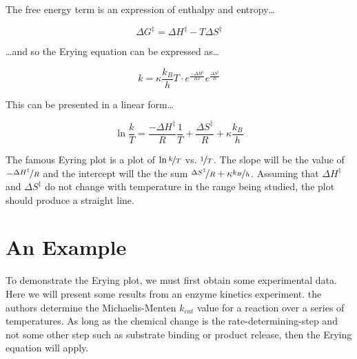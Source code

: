 \documentclass{tufte-handout}
\begin{document}
The free energy term is an expression of enthalpy and entropy\ldots

$$ \Delta G^\ddagger = \Delta H^\ddagger - T\Delta S^\ddagger $$

\noindent \ldots and so the Erying equation can be expressed as\ldots

$$ k = \kappa \frac{k_B}{h}T \cdot e^{\frac{-\Delta H^\ddagger}{RT}}e^{\frac{\Delta S^\ddagger}{R}}$$

This can be presented in a linear form\ldots

$$ \ln{\frac{k}{T}} = \frac{-\Delta H^\ddagger}{R} \frac{1}{T} + \frac{\Delta S^\ddagger}{R} + \kappa \frac{k_B}{h} $$ 
\vspace{0mm}

The famous Eyring plot is a plot of $\ln{\nicefrac{k}{T}}$ vs. $\nicefrac{1}{T}$. The slope will be the value of $-\nicefrac{\Delta H^\ddagger}{R}$ and the intercept will the the sum $\nicefrac{\Delta S^\ddagger}{R} + \kappa \nicefrac{k_B}{h}$. Assuming that $\Delta H^\ddagger$ and $\Delta S^\ddagger$ do not change with temperature in the range being studied, the plot should produce a straight line.



\clearpage

\section{An Example}

To demonstrate the Erying plot, we must first obtain some experimental data. Here we will present some results from an enzyme kinetics experiment. the authors determine the Michaelis-Menten $k_{cat}$ value for a reaction over a series of temperatures. As long as the chemical change is the rate-determining-step and not some other step such as substrate binding or product release,
then the Erying equation will apply.
\end{document}
